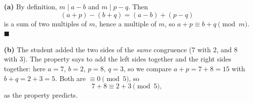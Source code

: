 \textbf{(a)} By definition, $m\mid a-b$ and $m\mid p-q$. Then
\[
(a+p)-(b+q)=(a-b)+(p-q)
\]
is a sum of two multiples of $m$, hence a multiple of $m$, so $a+p\equiv b+q\pmod m$. $\blacksquare$

\textbf{(b)} The student added the two sides of the \emph{same} congruence ($7$ with $2$, and $8$ with $3$). The property says to add the left sides together and the right sides together: here $a=7$, $b=2$, $p=8$, $q=3$, so we compare $a+p=7+8=15$ with $b+q=2+3=5$. Both are $\equiv0\pmod5$, so
\[
7+8\equiv2+3\pmod5,
\]
as the property predicts.
